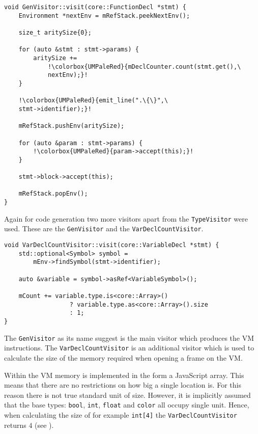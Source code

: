 \begin{lstlisting}[escapechar=!, caption={The
\texttt{visit(FunctionDecl *)} method in the \texttt{GenVisitor}
class (ir\_gen/GenVisitor.cpp)}, label=lst:genfuncdecl]
void GenVisitor::visit(core::FunctionDecl *stmt) {
    Environment *nextEnv = mRefStack.peekNextEnv();

    size_t aritySize{0};

    for (auto &stmt : stmt->params) {
        aritySize +=
            !\colorbox{UMPaleRed}{mDeclCounter.count(stmt.get(),\
            nextEnv);}!
    }

    !\colorbox{UMPaleRed}{emit_line(".\{\}",\
    stmt->identifier);}!

    mRefStack.pushEnv(aritySize);

    for (auto &param : stmt->params) {
        !\colorbox{UMPaleRed}{param->accept(this);}!
    }

    stmt->block->accept(this);

    mRefStack.popEnv();
}
\end{lstlisting}

Again for code generation two more visitors apart from the
\texttt{TypeVisitor} were used. These are the
\texttt{GenVisitor} and the \texttt{VarDeclCountVisitor}.

\begin{lstlisting}[caption={The \texttt{visit(VariableDecl *)}
method in the \texttt{VarDeclCountVisitor} class
(ir\_gen/VarDeclCountVisitor.cpp)}, label=lst:vardeclcount]
void VarDeclCountVisitor::visit(core::VariableDecl *stmt) {
    std::optional<Symbol> symbol =
        mEnv->findSymbol(stmt->identifier);

    auto &variable = symbol->asRef<VariableSymbol>();

    mCount += variable.type.is<core::Array>()
                  ? variable.type.as<core::Array>().size
                  : 1;
}
\end{lstlisting}

The \texttt{GenVisitor} as its name suggest is the main visitor
which produces the VM instructions. The
\texttt{VarDeclCountVisitor} is an additional visitor which is
used to calculate the size of the memory required when opening a
frame on the VM.

\begin{note}\label{sss:famesizecalc}
Within the VM memory is implemented in the form a JavaScript
array. This means that there are no restrictions on how big a
single location is. For this reason there is not true standard
unit of size. However, it is implicitly assumed that the base
types: \texttt{bool}, \texttt{int}, \texttt{float} and
\texttt{color} all occupy single unit. Hence, when calculating
the size of for example \texttt{int[4]} the
\texttt{VarDeclCountVisitor} returns $4$ (see
\listref{vardeclcount}).
\end{note}

